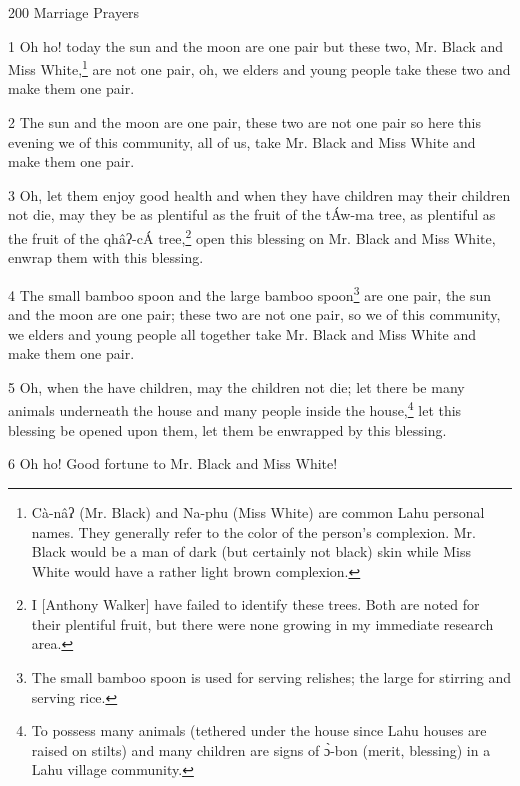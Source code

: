 
200 Marriage Prayers

1 Oh ho! today the sun and the moon are one pair but these two, Mr. Black and Miss
White,\footnote{Cà-nâʔ (Mr. Black) and Na-phu (Miss White) are common Lahu personal names. They generally refer to the color of the person's complexion. Mr. Black would be a man of dark (but certainly not black) skin while Miss White would have a rather light brown complexion.} are not one pair, oh, we elders and young people take these two and make
them one pair.

2 The sun and the moon are one pair, these two are not one pair so here this evening
we of this community, all of us, take Mr. Black and Miss White and make them one
pair.

3 Oh, let them enjoy good health and when they have children may their children
not die, may they be as plentiful as the fruit of the tÁw-ma tree, as plentiful
as the fruit of the qhâʔ-cÁ tree,\footnote{I [Anthony Walker] have failed to identify these trees. Both are noted for their plentiful fruit, but there were none growing in my immediate research area.} open this blessing on Mr. Black and Miss
White, enwrap them with this blessing.

4 The small bamboo spoon and the large bamboo spoon\footnote{The small bamboo spoon is used for serving relishes; the large for stirring and serving rice.} are one pair, the sun and
the moon are one pair; these two are not one pair, so we of this community, we
elders and young people all together take Mr. Black and Miss White and make them
one pair.

5 Oh, when the have children, may the children not die; let there be many animals
underneath the house and many people inside the house,\footnote{To possess many animals (tethered under the house since Lahu houses are raised on stilts) and many children are signs of ɔ̀-bon (merit, blessing) in a Lahu village community.} let this blessing be
opened upon them, let them be enwrapped by this blessing.

6 Oh ho! Good fortune to Mr. Black and Miss White!

